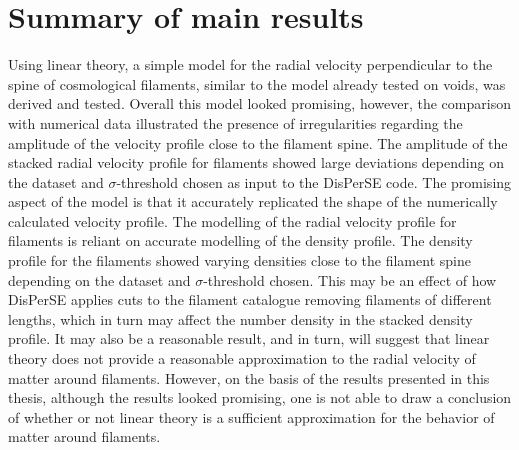 \section{Summary of main results}\label{sec:mainresults}
Using linear theory, a simple model for the radial velocity perpendicular to the spine of cosmological filaments, similar to the model already tested on voids, was derived and tested. Overall this model looked promising, however, the comparison with numerical data illustrated the presence of irregularities regarding the amplitude of the velocity profile close to the filament spine. The amplitude of the stacked radial velocity profile for filaments showed large deviations depending on the dataset and $\sigma$-threshold chosen as input to the DisPerSE code. The promising aspect of the model is that it accurately replicated the shape of the numerically calculated velocity profile. The modelling of the radial velocity profile for filaments is reliant on accurate modelling of the density profile. The density profile for the filaments showed varying densities close to the filament spine depending on the dataset and $\sigma$-threshold chosen. This may be an effect of how DisPerSE applies cuts to the filament catalogue removing filaments of different lengths, which in turn may affect the number density in the stacked density profile. It may also be a reasonable result, and in turn, will suggest that linear theory does not provide a reasonable approximation to the radial velocity of matter around filaments. However, on the basis of the results presented in this thesis, although the results looked promising, one is not able to draw a conclusion of whether or not linear theory is a sufficient approximation for the behavior of matter around filaments.\\\indent
